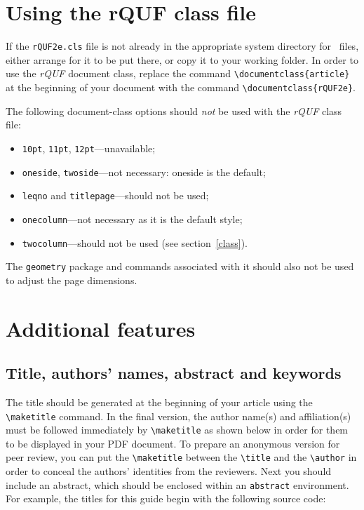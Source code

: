 \documentclass{rQUF2e}
\theoremstyle{plain}
\theoremstyle{definition}
\theoremstyle{remark}
\begin{document}
\section{Using the {\bi rQUF} class file}

If the \texttt{rQUF2e.cls} file is not already in the appropriate system directory for \LaTeXe\ files, either
arrange for it to be put there, or copy it to your working folder. In order to use the \textit{rQUF} document class, replace the command
\verb"\documentclass{article}" at the beginning of your document with the command
\verb"\documentclass{rQUF2e}".

The following document-class options should \emph{not} be used with the \textit{rQUF} class file:
\begin{itemize}
  \item {\tt 10pt}, {\tt 11pt}, {\tt 12pt}---unavailable;
  \item {\tt oneside}, {\tt twoside}---not necessary: oneside is the default;
  \item {\tt leqno} and {\tt titlepage}---should not be used;
  \item {\tt onecolumn}---not necessary as it is the default style;
  \item {\tt twocolumn}---should not be used (see section~\ref{class}).
\end{itemize}
The \texttt{geometry} package and commands associated with it should also not be used to adjust the page dimensions.


\section{Additional features}

\subsection{Title, authors' names, abstract and keywords}

The title should be generated at the beginning of your article using the \verb"\maketitle" command.
In the final version, the author name(s) and affiliation(s) must be followed immediately by \verb"\maketitle" as shown below in order for them to be displayed in your PDF document.
To prepare an anonymous version for peer review, you can put the \verb"\maketitle" between the \verb"\title" and the \verb"\author" in order to conceal the authors' identities from the reviewers.
Next you should include an abstract, which should be enclosed within an \texttt{abstract} environment.
For example, the titles for this guide begin with the following source code:
\end{document}
